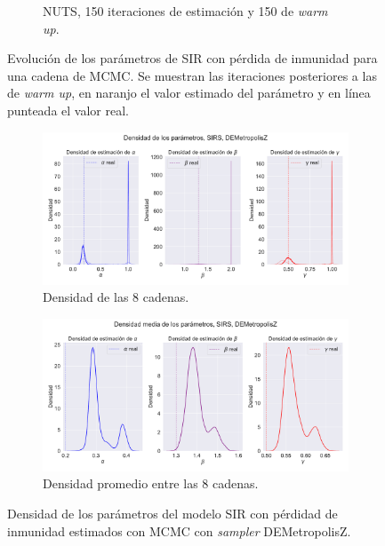 \begin{figure}[h]
\begin{subfigure}[b]{0.49\linewidth}
        \caption{NUTS, 150 iteraciones de estimación y 150 de \textit{warm up}.}
        \label{fig:NUTS_sirs_params_trace}
    \end{subfigure}
    \caption{Evolución de los parámetros de SIR con pérdida de inmunidad para una cadena de MCMC. Se muestran las iteraciones posteriores a las de \textit{warm up}, en naranjo el valor estimado del parámetro y en línea punteada el valor real.}
    \label{fig:MCMC_sirs_params_trace}
\end{figure}

\begin{figure}[h]
    \centering
    \begin{subfigure}[b]{\linewidth}
        \centering
        \includegraphics[width=0.55\linewidth]{img/content/chapter4/DEMetropolis_sirs_params_density.pdf}
        \caption{Densidad de las 8 cadenas.}
    \end{subfigure}
     \begin{subfigure}[b]{\linewidth}
        \centering
        \includegraphics[width=0.55\linewidth]{img/content/chapter4/DEMetropolis_sirs_params_density_mean.pdf}
        \caption{Densidad promedio entre las 8 cadenas.}
    \end{subfigure}
    \caption{Densidad de los parámetros del modelo SIR con pérdidad de inmunidad estimados con MCMC con \textit{sampler} DEMetropolisZ.}
\end{figure}

